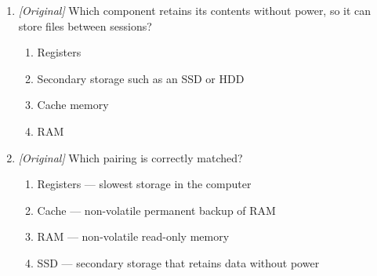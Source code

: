 \begin{enumerate}[label=\textbf{Q\arabic*.}, leftmargin=*]
\begin{enumerate}[label=\Alph*.]
  \end{enumerate}
\item \textit{[Original]} Which component retains its contents without
  power, so it can store files between sessions?
  \begin{enumerate}[label=\Alph*.]
    \item Registers
    \item Secondary storage such as an SSD or HDD
    \item Cache memory
    \item RAM
  \end{enumerate}
\item \textit{[Original]} Which pairing is correctly matched?
  \begin{enumerate}[label=\Alph*.]
    \item Registers --- slowest storage in the computer
    \item Cache --- non-volatile permanent backup of RAM
    \item RAM --- non-volatile read-only memory
    \item SSD --- secondary storage that retains data without power
  \end{enumerate}


\end{enumerate}

